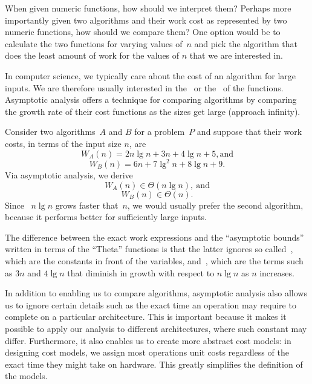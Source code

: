\begin{flex}
\label{grp:grm:analysis::asymptotics::given}

\begin{gram}
\label{grm:analysis::asymptotics::given}
When given numeric functions, how should we interpret them?
Perhaps more importantly given two algorithms and their work cost as
represented by two numeric functions, how should we compare them?
One option would be to calculate the two functions for varying values
of~$n$ and pick the algorithm that does the least amount of work for
the values of $n$ that we are interested in.

In computer science, we typically care about the cost of an algorithm
for large inputs.
We are therefore usually interested in the~ or
the~ of the functions.
Asymptotic analysis offers a technique for comparing algorithms by
comparing the growth rate of their cost functions as the sizes get
large (approach infinity).

\end{gram}

\begin{example}[Asymptotics]
\label{xmpl:analysis::asymptotics::asymptotics}
Consider two algorithms~$A$ and $B$ for a problem~$P$ and suppose that
their work costs, in terms of the input size $n$, are 
$$W_A(n) = 2n\lg{n} + 3n + 4\lg{n} + 5, \mbox{and}$$
$$W_B(n) = 6n + 7\lg^2{n} + 8\lg{n}+ 9.$$
Via asymptotic analysis, we derive 
$$W_A(n) \in \Theta(n\lg{n}),~\mbox{and}$$
$$W_B(n) \in \Theta(n).$$
Since ~$n\lg{n}$ grows faster that~$n$, we would usually prefer the
second algorithm, because it performs better for sufficiently large
inputs.

The difference between the exact work expressions and the ``asymptotic
bounds'' written in terms of the ``Theta'' functions is that the
latter ignores so called~, which are the
constants in front of the variables, and~,
which are the terms such as $3n$ and $4\lg{n}$ that diminish in
growth with respect to $n\lg{n}$ as $n$ increases.

\end{example}
\end{flex}

\begin{cluster}
\label{grp:rmrk:analysis::asymptotics::addition}

\begin{remark}
\label{rmrk:analysis::asymptotics::addition}
In addition to enabling us to compare algorithms, asymptotic analysis
also allows us to ignore certain details such as the exact time an
operation may require to complete on a particular architecture.
This is important because it makes it possible to apply our analysis
to different architectures, where such constant may differ.
Furthermore, it also enables us to create more abstract cost models:
in designing cost models, we assign most operations unit costs
regardless of the exact time they might take on hardware.
This greatly simplifies the definition of the models.

\end{remark}
\end{cluster}

